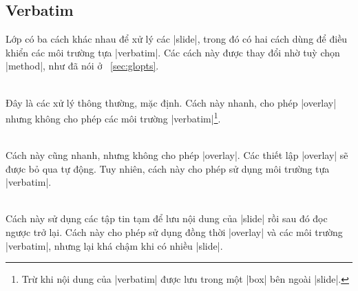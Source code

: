 
\subsection{Verbatim}

\label{sec:verbatim}
Lớp  có ba cách khác nhau để xử lý các |slide|,
trong đó có hai cách dùng để điều khiển các môi trường tựa |verbatim|.
Các cách này được thay đổi nhờ tuỳ chọn |method|,
như đã nói ở ~\vref{sec:glopts}.
\begin{description}
\item{}\\
Đây là các xử lý thông thường, mặc định. Cách này nhanh, cho phép
|overlay| nhưng không cho phép các môi trường |verbatim|\footnote{Trừ khi
nội dung của |verbatim| được lưu trong một |box| bên ngoài |slide|.}.
\item{}\\
Cách này cũng nhanh, nhưng không cho phép |overlay|. Các thiết lập |overlay|
sẽ được bỏ qua tự động. Tuy nhiên, cách này cho phép sử dụng môi trường
tựa |verbatim|.
\item{}\\
Cách này sử dụng các tập tin tạm để lưu nội dung của |slide| rồi sau đó
đọc ngược trở lại. Cách này cho phép sử dụng đồng thời |overlay| và các
môi trường |verbatim|, nhưng lại khá chậm khi có nhiều |slide|.
\end{description}

